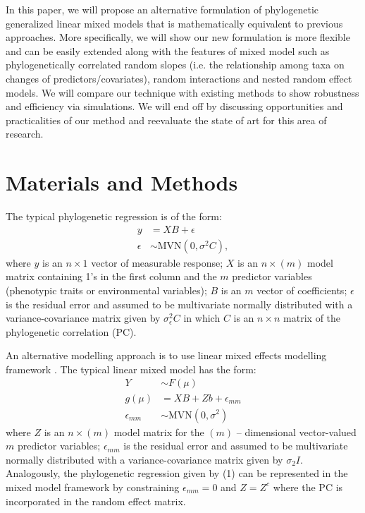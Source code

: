 In this paper, we will propose an alternative formulation of phylogenetic generalized linear mixed models that is mathematically equivalent to previous approaches. 
More specifically, we will show our new formulation is more flexible and can be easily extended along with the features of mixed model such as phylogenetically correlated random slopes (i.e. the relationship among taxa on changes of predictors/covariates), random interactions  and nested random effect models.
We will compare our technique with existing methods to show robustness and efficiency via simulations.
We will end off by discussing opportunities and practicalities of our method and reevaluate the state of art for this area of research. 

\section{Materials and Methods}

The typical phylogenetic regression is of the form:
\begin{align}
y & = XB + \epsilon \\
\epsilon & \sim \textrm{MVN}(0,\sigma^{2}C),
\label{eq:gls}
\end{align}
where $y$ is an $n \times 1$ vector of measurable response; $X$ is an $n \times (m)$ model matrix containing 1's in the first column and the $m$ predictor variables (phenotypic traits or environmental variables); $B$ is an $m$ vector of coefficients; $\epsilon$ is the residual error and assumed to be multivariate normally distributed with a variance-covariance matrix given by $\sigma^{2}_{\epsilon}C$ in which $C$ is an $n \times n$ matrix of the phylogenetic correlation (PC).

An alternative modelling approach is to use linear mixed effects modelling framework \citep{lynch1991methods}.
The typical linear mixed model has the form:
\begin{align}
Y & \sim F(\mu) \\
g(\mu) & = XB + Zb + \epsilon_{mm} \\
\epsilon_{mm} & \sim \textrm{MVN}(0,\sigma^2)
\end{align}
where $Z$ is an $n \times (m)$ model matrix for the $(m)$ -- dimensional vector-valued $m$ predictor variables; $\epsilon_{mm}$ is the residual error and assumed to be multivariate normally distributed with a variance-covariance matrix given by $\sigma_{2}I$.
Analogously, the phylogenetic regression given by (1) can be represented in the mixed model framework by constraining $\epsilon_{mm} = 0$ and $Z=Z^{c}$ where the PC is incorporated in the random effect matrix. 

